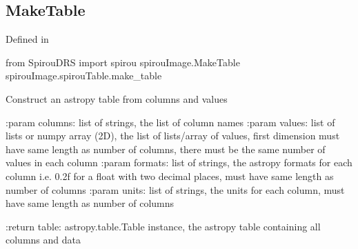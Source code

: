 \begin{minipage}{\textwidth}
\subsection{MakeTable}

Defined in \spirouImage{}

\begin{pythonbox}
from SpirouDRS import spirou
spirouImage.MakeTable
spirouImage.spirouTable.make_table
\end{pythonbox}

\begin{pythondocstring}
Construct an astropy table from columns and values

:param columns: list of strings, the list of column names
:param values: list of lists or numpy array (2D), the list of lists/array
               of values, first dimension must have same length as number
               of columns, there must be the same number of values in each
               column
:param formats: list of strings, the astropy formats for each column
                i.e. 0.2f  for a float with two decimal places, must have
                same length as number of columns
:param units: list of strings, the units for each column, must have
              same length as number of columns

:return table: astropy.table.Table instance, the astropy table containing
               all columns and data
\end{pythondocstring}
\end{minipage}


